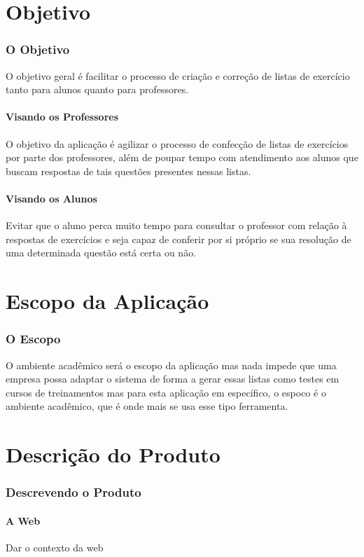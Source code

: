 \documentclass[12pt,oneside,a4paper,article]{abntex2}
\begin{document}
\part{Objetivo}
	\section{O Objetivo}
		O objetivo geral é facilitar o processo de criação e correção de listas de exercício tanto para alunos quanto para professores.
		\subsection{Visando os Professores}
			O objetivo da aplicação é agilizar o processo de confecção de listas de exercícios por parte dos professores, além de poupar tempo com atendimento aos alunos
			que buscam respostas de tais questões presentes nessas listas.

		\subsection{Visando os Alunos}
			Evitar que o aluno perca muito tempo para consultar o professor com relação à respostas de exercícios e seja capaz de conferir por si próprio se sua resolução de
			uma determinada questão está certa ou não.
			
\part{Escopo da Aplicação}
	\section{O Escopo}
		O ambiente acadêmico será o escopo da aplicação mas nada impede que uma empresa possa adaptar o sistema de forma a gerar essas listas como  testes em cursos de
		treinamentos mas para esta aplicação em específico, o espoco é o ambiente acadêmico, que é onde mais se usa esse tipo ferramenta.

\part{Descrição do Produto}
	\section{Descrevendo o Produto}
		
		\subsection{A Web}
			Dar o contexto da web
		
\end{document}
